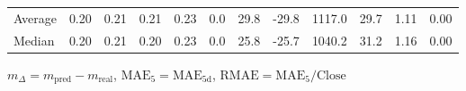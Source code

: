 \begin{threeparttable}
{\begin{tabular}{lrrrrrrrrrrr}
Average &          0.20 &          0.21 &          0.21 &        0.23 &                 0.0 &                29.8 &      -29.8 &              1117.0 &             29.7 &            1.11 &                   0.00 \\
 Median &          0.20 &          0.21 &          0.20 &        0.23 &                 0.0 &                25.8 &      -25.7 &              1040.2 &             31.2 &            1.16 &                   0.00 \\
\bottomrule
\end{tabular}
}
\begin{tablenotes}\footnotesize
\item $m_\Delta=m_{\text{pred}}-m_{\text{real}}$,
$\mathrm{MAE}_5=\mathrm{MAE}_{5\text{d}}$,
$\mathrm{RMAE}=\mathrm{MAE}_5/\text{Close}$
\end{tablenotes}
\end{threeparttable}
\endgroup

